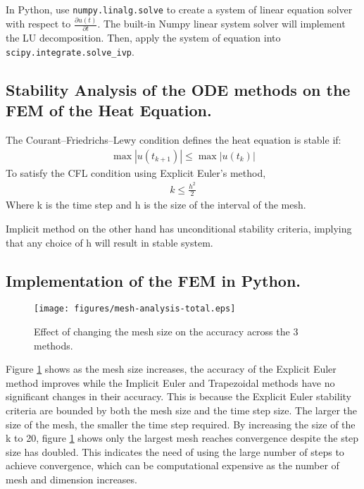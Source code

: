 \documentclass{article}
\begin{document}
In Python, use \texttt{numpy.linalg.solve} to create a system of linear equation solver with respect to $\frac{\partial u(t)}{\partial t}$. The built-in Numpy linear system solver will implement the LU decomposition. Then, apply the system of equation into \texttt{scipy.integrate.solve\_ivp}.


\subsection{Stability Analysis of the ODE methods on the FEM of the Heat Equation.}%
\label{sub:Stability Analysis of the ODE methods on the FEM of the Heat Equation.}
The Courant–Friedrichs–Lewy condition defines the heat equation is stable if:
\begin{align}
  \max |u(t_{k+1})| \le \max |u(t_k)|
\end{align}
To satisfy the CFL condition using Explicit Euler's method,
\begin{align}
  k \le \frac{h^2}{2}
\end{align}
Where k is the time step and h is the size of the interval of the mesh.

Implicit method on the other hand has unconditional stability criteria, implying that any choice of h will result in stable system.







\subsection{Implementation of the FEM in Python.}%
\label{sub:Implementation of the FEM in Python.}
\begin{figure}[H]
  \centering
  \texttt{[image: figures/mesh-analysis-total.eps]}
  \caption{Effect of changing the mesh size on the accuracy across the 3 methods.}
  \label{fig:figures-mesh-analysis-total-eps}
\end{figure}

Figure \ref{fig:figures-mesh-analysis-total-eps} shows as the mesh size increases, the accuracy 
of the Explicit Euler method improves while the Implicit Euler and Trapezoidal methods have no 
significant changes in their accuracy. This is because the Explicit Euler stability criteria are
bounded by both the mesh size and the time step size. The larger the size of the mesh, the smaller the time step required. By increasing the size of the k to 20, figure \ref{fig:figures-mesh-analysis-total-eps} shows only the largest mesh reaches convergence despite the step size has doubled. This indicates the need of using  the large number of steps to achieve convergence, which
can be computational expensive as the number of mesh and dimension increases.
\end{document}
